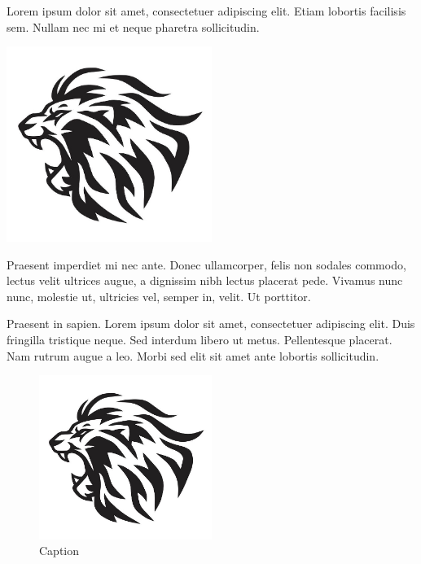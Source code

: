 \documentclass[12pt]{article}
\begin{document}
\newpage


Lorem ipsum dolor sit amet, consectetuer adipiscing elit. 
Etiam lobortis facilisis sem. Nullam nec mi et neque pharetra
sollicitudin.

\includegraphics[width=0.5\textwidth]{./lion.jpg}

Praesent imperdiet mi nec
ante. Donec ullamcorper, felis non sodales commodo, lectus velit
ultrices augue, a dignissim nibh lectus placerat pede.
 Vivamus nunc nunc, molestie ut, ultricies
vel, semper in, velit. Ut porttitor.



\newpage


Praesent in sapien. Lorem ipsum dolor sit amet, consectetuer adipiscing 
elit. Duis fringilla tristique neque. Sed interdum libero ut metus. 
Pellentesque placerat. Nam rutrum augue a leo. Morbi sed elit sit amet 
ante lobortis sollicitudin.

\begin{figure}[h]
\begin{center}
\includegraphics[width=0.5\textwidth]{./lion.jpg}
\caption{Caption}
\label{fig:figure2}
\end{center}
\end{figure}

\newpage
\end{document}

